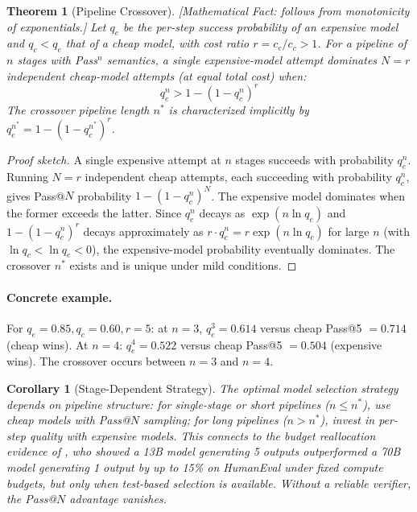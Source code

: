 \documentclass[11pt, a4paper]{googledeepmind}
\newtheorem{theorem}{Theorem}[section]
\newtheorem{corollary}{Corollary}[section]
\begin{document}
\begin{theorem}[Pipeline Crossover]
\emph{[Mathematical Fact: follows from monotonicity of exponentials.]}
\label{thm:routing-crossover}
Let $q_e$ be the per-step success probability of an expensive model and $q_c < q_e$ that of a cheap model, with cost ratio $r = c_e / c_c > 1$. For a pipeline of $n$ stages with Pass${}^n$ semantics, a single expensive-model attempt dominates $N = r$ independent cheap-model attempts (at equal total cost) when:
\begin{equation}
q_e^n > 1 - (1 - q_c^n)^r
\end{equation}
The crossover pipeline length $n^*$ is characterized implicitly by $q_e^{n^*} = 1 - (1 - q_c^{n^*})^r$.
\end{theorem}

\begin{proof}[Proof sketch]
A single expensive attempt at $n$ stages succeeds with probability $q_e^n$. Running $N = r$ independent cheap attempts, each succeeding with probability $q_c^n$, gives Pass@$N$ probability $1 - (1 - q_c^n)^N$. The expensive model dominates when the former exceeds the latter. Since $q_e^n$ decays as $\exp(n \ln q_e)$ and $1 - (1 - q_c^n)^r$ decays approximately as $r \cdot q_c^n = r \exp(n \ln q_c)$ for large $n$ (with $\ln q_c < \ln q_e < 0$), the expensive-model probability eventually dominates. The crossover $n^*$ exists and is unique under mild conditions.
\end{proof}

\paragraph{Concrete example.} For $q_e = 0.85, q_c = 0.60, r = 5$: at $n = 3$, $q_e^3 = 0.614$ versus cheap Pass@5 $= 0.714$ (cheap wins). At $n = 4$: $q_e^4 = 0.522$ versus cheap Pass@5 $= 0.504$ (expensive wins). The crossover occurs between $n = 3$ and $n = 4$.

\begin{corollary}[Stage-Dependent Strategy]
\label{cor:routing-strategy}
The optimal model selection strategy depends on pipeline structure: for single-stage or short pipelines ($n \leq n^*$), use cheap models with Pass@$N$ sampling; for long pipelines ($n > n^*$), invest in per-step quality with expensive models. This connects to the budget reallocation evidence of \citet{hassid2024budget}, who showed a 13B model generating 5 outputs outperformed a 70B model generating 1 output by up to 15\% on HumanEval under fixed compute budgets, but only when test-based selection is available. Without a reliable verifier, the Pass@$N$ advantage vanishes.
\end{corollary}
\end{document}
